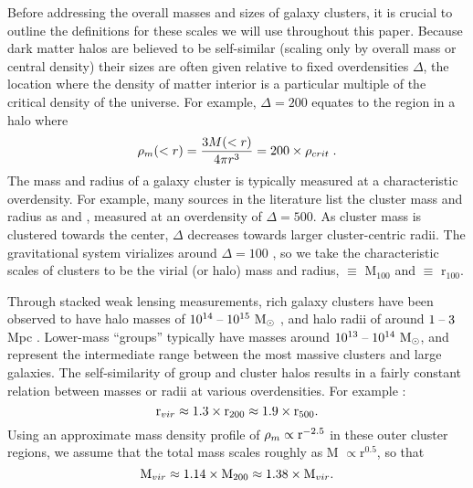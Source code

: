Before addressing the overall masses and sizes of galaxy clusters, it
is crucial to outline the definitions for these scales we will use
throughout this paper. Because dark matter halos are believed to be
self-similar (scaling only by overall mass or central density) their
sizes are often given relative to fixed overdensities $\Delta$, the
location where the density of matter interior is a particular multiple of
the critical density of the universe. For example, $\Delta = 200$
equates to the region in a halo where
\begin{equation}
\rho_m(<r) = \frac{3M(<r)}{4\pi{}r^3} = 200\times\rho_{crit}\;. \nonumber
\end{equation}
The mass and radius of a galaxy cluster is typically measured at a
characteristic overdensity. For example, many sources in the
literature list the cluster mass and radius as \Mfive{} and
\rfive{}, measured at an overdensity of $\Delta = 500$. As cluster
mass is clustered towards the center, $\Delta$ decreases towards
larger cluster-centric radii. The gravitational system virializes
around $\Delta = 100$ \citep{Eke1996}, so we take the characteristic
scales of clusters to be the virial (or halo) mass and radius,
\Mvir{} $ \equiv $ M$_{100}$ and \rvir{} $ \equiv $ r$_{100}$.

Through stacked weak lensing measurements, rich galaxy clusters have
been observed to have halo masses of $10^{14}\;\textrm{--}\;10^{15}~\textrm{M}_\odot{}$
\citep{Mandelbaum2008}, and halo radii of around $1\;\textrm{--}\;3$ Mpc
\citep{Vikhlinin2006}. Lower-mass ``groups'' typically have masses
around $10^{13} \;\textrm{--}\; 10^{14}~\textrm{M}_\odot{}$, and represent the intermediate
range between the most massive clusters and large galaxies. The
self-similarity of group and cluster halos results in a fairly
constant relation between masses or radii at various overdensities. For
example \citep{Rasheed2011}:
\begin{equation}
\textrm{r\ensuremath{_{vir}}}{} \approx 1.3\times{}\textrm{r\ensuremath{_{200}}}{} \approx
1.9\times{}\textrm{r\ensuremath{_{500}}}{}.
\end{equation}
Using an approximate mass density profile of $\rho_m \propto
\textrm{r}^{-2.5}$ in these outer cluster regions, we assume that the
total mass scales roughly as M $\propto \textrm{r}^{0.5}$, so that
\begin{equation}
\textrm{M\ensuremath{_{vir}}}{} \approx 1.14\times{}\textrm{M\ensuremath{_{200}}}{} \approx 1.38 \times{}\textrm{M\ensuremath{_{vir}}}{}.
\end{equation}

